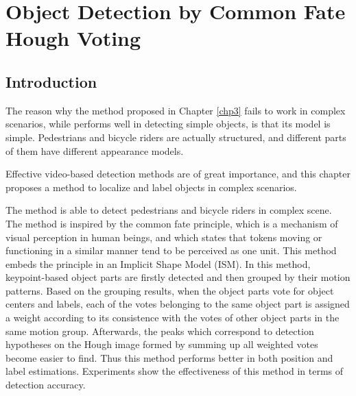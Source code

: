 \chapter{Object Detection by Common Fate Hough Voting}
\label{chp4}
\section{Introduction}

The reason why the method proposed in  Chapter \ref{chp3} fails to work  in complex scenarios, while performs well in detecting simple objects, is that its model is simple. Pedestrians and bicycle riders are actually structured, and different parts of them  have different appearance models.

Effective video-based detection methods are of great importance, and this chapter proposes a method to localize and label objects in complex scenarios.

The method is able to detect pedestrians and bicycle riders in complex scene. The method is inspired by the common fate principle, which is a mechanism of visual perception in human beings, and which states that tokens moving or functioning in a similar manner tend to be  perceived
as one unit. This method embeds the principle in an Implicit Shape Model (ISM). In this method, keypoint-based
object parts are firstly detected and then grouped by their motion patterns. Based on the grouping results, when the object parts vote for object centers and labels, each of the votes belonging to the same object part is assigned a weight according to its consistence with the votes of other object parts in the same motion group. Afterwards, the peaks which correspond to detection hypotheses on the Hough image formed by summing up all weighted votes become easier to find. Thus this method  performs better in both position and label estimations. Experiments show the effectiveness of this method in terms of detection accuracy.





